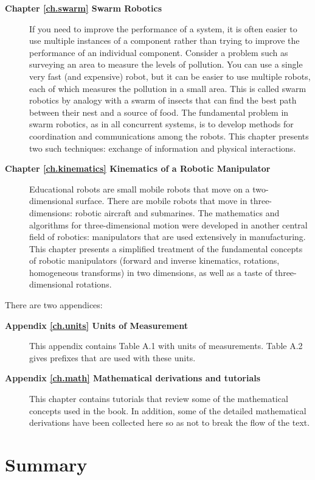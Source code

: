 \begin{description}
\smallskip
\item [\textbf{Chapter \ref{ch.swarm} Swarm Robotics}] If you need to improve the performance of a system, it is often easier to use multiple instances of a component rather than trying to improve the performance of an individual component. Consider a problem such as surveying an area to measure the levels of pollution. You can use a single very fast (and expensive) robot, but it can be easier to use multiple robots, each of which measures the pollution in a small area. This is called swarm robotics by analogy with a swarm of insects that can find the best path between their nest and a source of food. The fundamental problem in swarm robotics, as in all concurrent systems, is to develop methods for coordination and communications among the robots. This chapter presents two such techniques: exchange of information and physical interactions.
\smallskip
\item [\textbf{Chapter \ref{ch.kinematics} Kinematics of a Robotic Manipulator}] Educational robots are small mobile robots that move on a two-dimensional surface. There are mobile robots that move in three-dimensions: robotic aircraft and submarines. The mathematics and algorithms for three-dimensional motion were developed in another central field of robotics: manipulators that are used extensively in manufacturing. This chapter presents a simplified treatment of the fundamental concepts of robotic manipulators (forward and inverse kinematics, rotations, homogeneous transforms) in two dimensions, as well as a taste of three-dimensional rotations.
\end{description}

There are two appendices:
\begin{description}
\item [\textbf{Appendix \ref{ch.units} Units of Measurement}] This appendix contains Table A.1 with units of measurements. Table A.2 gives prefixes that are used with these units.
\smallskip
\item [\textbf{Appendix \ref{ch.math} Mathematical derivations and tutorials}] This chapter contains tutorials that review some of the mathematical concepts used in the book. In addition, some of the detailed mathematical derivations have been collected here so as not to break the flow of the text.
\end{description}

\section{Summary}

